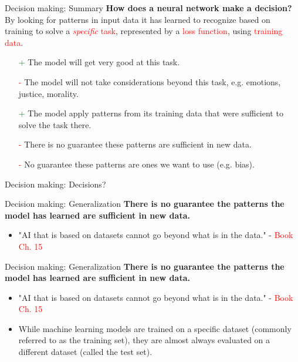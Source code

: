 \documentclass[8pt]{beamer}
\begin{document}
	\begin{frame}[t]{Decision making: Summary}
		\vspace{2cm}
		\textbf{How does a neural network make a decision?}\\
		By looking for patterns in input data it has learned to recognize based on training to solve a \textcolor{red}{\textit{specific} task}, represented by a \textcolor{red}{loss function}, using \textcolor{red}{training data}.
		\begin{itemize}
			\item[\textcolor{green}+] The model will get very good at this task.
			\item[\textcolor{red}-] The model will not take considerations beyond this task, e.g. emotions, justice, morality.
			\item[\textcolor{green}+] The model apply patterns from its training data that were sufficient to solve the task there.
			\item[\textcolor{red}-] There is no guarantee these patterns are sufficient in new data.
			\item[\textcolor{red}-] No guarantee these patterns are ones we want to use (e.g. bias).
		\end{itemize}
	\end{frame}

	\begin{frame}{Decision making: Decisions?}
	\end{frame}

	\begin{frame}[t]{Decision making: Generalization} %
		\centering
		\textbf{There is no guarantee the patterns the model has learned are sufficient in new data.}
		\begin{itemize}
			\item "AI that is based on datasets cannot go beyond what is in the data." - \textcolor{red}{Book Ch. 15}
		\end{itemize}
		\vspace{0.5cm}
	\end{frame}

	\begin{frame}[t]{Decision making: Generalization} %
		\centering
		\textbf{There is no guarantee the patterns the model has learned are sufficient in new data.}
		\begin{itemize}
			\item "AI that is based on datasets cannot go beyond what is in the data." - \textcolor{red}{Book Ch. 15}
			\item While machine learning models are trained on a specific dataset (commonly referred to as the training set), they are almost always evaluated on a different dataset (called the test set).
		\end{itemize}
	\end{frame}
\end{document}
